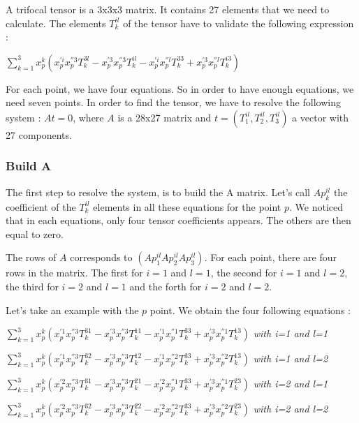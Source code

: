 \documentclass{report}
\begin{document}
A trifocal tensor is a 3x3x3 matrix. It contains 27 elements that we need to calculate. The elements $T_{k}^{il}$ of the tensor have to validate the following expression : 
\begin{center}
 $ \displaystyle { \sum_{k = 1}^{3}} x_{p}^{k}(x_{p}^{'i}x_{p}^{''3}T_{k}^{3l} - x_{p}^{'3}x_{p}^{''3}T_{k}^{il} - x_{p}^{'i}x_{p}^{''l}T_{k}^{33} + x_{p}^{'3}x_{p}^{''l}T_{k}^{i3})$ 
\end{center}
For each point, we have four equations. So in order to have enough equations, we need seven points. 
In order to find the tensor, we have to resolve the following system : $At = 0$, where $A$ is a 28x27 matrix and $t = ( T_{1}^{il}, T_{2}^{il}, T_{3}^{il})$ a vector with 27 components.

\subsubsection{Build A}
The first step to resolve the system, is to build the A matrix. Let's call $Ap_{k}^{il}$ the coefficient of the $T_{k}^{il}$ elements in all these equations for the point $p$. We noticed that in each equations, only four tensor coefficients appears. The others are then equal to zero. 

The rows of $A$ corresponds to $( Ap_{1}^{il}  Ap_{2}^{il}  Ap_{3}^{il} )$.
For each point, there are four rows in the matrix. The first for $i=1$ and $l=1$, the second for $i=1$ and $l=2$, the third for $i=2$ and $l=1$ and the forth for $i=2$ and $l=2$.


Let's take an example with the $p$ point. 
We obtain the four following equations : 
\begin{center}
 $ \displaystyle { \sum_{k = 1}^{3}} x_{p}^{k}(x_{p}^{'1}x_{p}^{''3}T_{k}^{31} - x_{p}^{'3}x_{p}^{''3}T_{k}^{11} - x_{p}^{'1}x_{p}^{''1}T_{k}^{33} + x_{p}^{'3}x_{p}^{''1}T_{k}^{13})$  \textit{with i=1 and l=1}
\end{center}
\begin{center}
 $ \displaystyle { \sum_{k = 1}^{3}} x_{p}^{k}(x_{p}^{'1}x_{p}^{''3}T_{k}^{32} - x_{p}^{'3}x_{p}^{''3}T_{k}^{12} - x_{p}^{'1}x_{p}^{''2}T_{k}^{33} + x_{p}^{'3}x_{p}^{''2}T_{k}^{13})$  \textit{with i=1 and l=2} 
\end{center}
\begin{center}
 $ \displaystyle { \sum_{k = 1}^{3}} x_{p}^{k}(x_{p}^{'2}x_{p}^{''3}T_{k}^{31} - x_{p}^{'3}x_{p}^{''3}T_{k}^{21} - x_{p}^{'2}x_{p}^{''1}T_{k}^{33} + x_{p}^{'3}x_{p}^{''1}T_{k}^{23})$  \textit{with i=2 and l=1} 
\end{center}
\begin{center}
 $ \displaystyle { \sum_{k = 1}^{3}} x_{p}^{k}(x_{p}^{'2}x_{p}^{''3}T_{k}^{32} - x_{p}^{'3}x_{p}^{''3}T_{k}^{22} - x_{p}^{'2}x_{p}^{''2}T_{k}^{33} + x_{p}^{'3}x_{p}^{''2}T_{k}^{23})$  \textit{with i=2 and l=2} 
\end{center}
\end{document}

